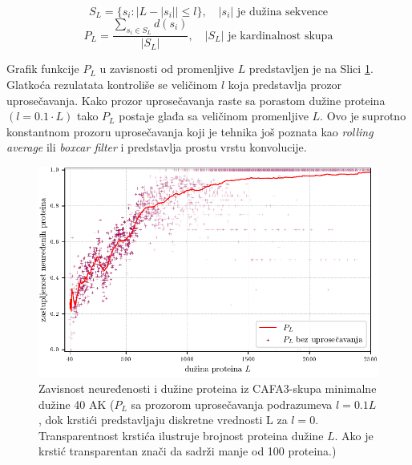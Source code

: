 $$ S_L = \{s_i :  | L -  | s_i | | \le l  \}, \quad   |s_i| \text{ je dužina sekvence}  $$
$$ P_L = \dfrac{ \sum_{s_i \in S_L} d(s_i)} {| S_L |}, \quad   |S_L| \text{ je kardinalnost skupa}$$

Grafik funkcije $P_L$ u zavisnosti od promenljive $L$ predstavljen je na Slici
\ref{fig:PL1}.  Glatkoća rezulatata kontroliše se veličinom $l$ koja
predstavlja prozor uprosečavanja. Kako prozor uprosečavanja raste sa porastom
dužine proteina $(l = 0.1 \cdot L)$ tako $P_L$ postaje glađa sa veličinom
promenljive $L$. Ovo je suprotno konstantnom prozoru uprosečavanja  koji je
tehnika još poznata kao \textit{rolling average} ili \textit{boxcar filter} i
predstavlja prostu vrstu konvolucije. 


\begin{figure}[th]
\centering
\includegraphics[]{plots/PL_F}
\caption {
  Zavisnost neuređenosti i dužine proteina iz CAFA3-skupa minimalne dužine 40 AK
  \footnotesize
  ($P_L$ sa prozorom uprosečavanja podrazumeva $l = 0.1L$, dok
  krstići predstavljaju diskretne vrednosti L za $l = 0$. Transparentnost krstića
  ilustruje brojnost proteina dužine $L$. Ako je krstić transparentan
  znači da sadrži manje od 100 proteina.)
}
\label{fig:PL1}
\end{figure}


